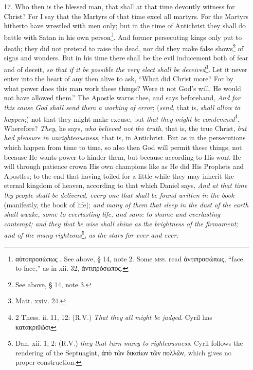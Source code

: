 17. Who then is the blessed man, that shall at that time devoutly witness for Christ? For I say that the Martyrs of that time excel all martyrs. For the Martyrs hitherto have wrestled with men only; but in the time of Antichrist they shall do battle with Satan in his own person\footnote{\textgreek{αὐτοπροσώπως} . See above, § 14, note 2. Some \textsc{mss.} read \textgreek{ἀντιπροσώπως}, “face to face,” as in xii. 32, \textgreek{ἀντιπρόσωπος}.}. And former persecuting kings only put to death; they did not pretend to raise the dead, nor did they make false shows\footnote{See above, § 14, note 3.} of signs and wonders. But in his time there shall be the evil inducement both of fear and of deceit, \emph{so that if it be possible the very elect shall be deceived}\footnote{Matt. xxiv. 24.}. Let it never enter into the heart of any then alive to ask, “What did Christ more? For by what power does this man work these things? Were it not God’s will, He would not have allowed them.” The Apostle warns thee, and says beforehand, \emph{And for this cause God shall send them a working of error}; (\emph{send}, that is, \emph{shall allow to happen};) not that they might make excuse, but \emph{that they might be condemned}\footnote{2 Thess. ii. 11, 12: (R\textsc{.V.}) \emph{That they all might be judged}. Cyril has \textgreek{κατακριθῶσι}}. Wherefore? \emph{They}, he says, \emph{who believed not the truth}, that is, the true Christ, \emph{but had pleasure in unrighteousness}, that is, in Antichrist. But as in the persecutions which happen from time to time, so also then God will permit these things, not because He wants power to hinder them, but because according to His wont He will through patience crown His own champions like as He did His Prophets and Apostles; to the end that having toiled for a little while they may inherit the eternal kingdom of heaven, according to that which Daniel says, \emph{And at that time thy people shall be delivered, every one that shall be found written in the book} (manifestly, the book of life); \emph{and many of them that sleep in the dust of the earth shall awake, some to everlasting life, and same to shame and everlasting contempt; and they that be wise shall shine as the brightness of the firmament; and of the many righteous}\footnote{Dan. xii. 1, 2: (R.V.) \emph{they that turn many to righteousness}. Cyril follows the rendering of the Septuagint, \textgreek{ἀπὸ τῶν δικαίων τῶν πολλῶν}, which gives no proper construction.}, \emph{as the stars for ever and ever}.

